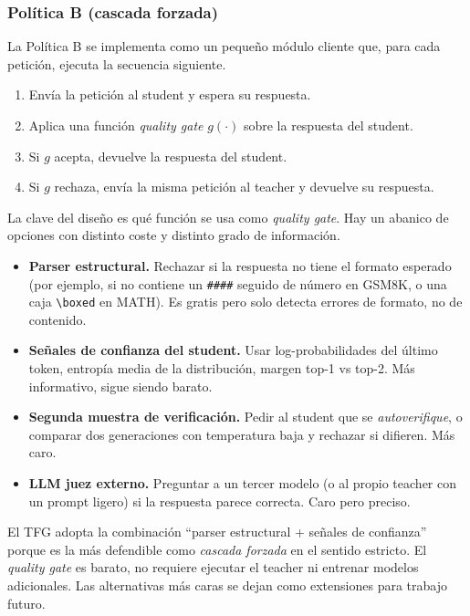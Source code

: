 \subsubsection{Política B (cascada forzada)}

La Política B se implementa como un pequeño módulo cliente que, para cada petición, ejecuta la secuencia siguiente.
\begin{enumerate}[nosep,leftmargin=*]
\item Envía la petición al student y espera su respuesta.
\item Aplica una función \textit{quality gate} $g(\cdot)$ sobre la respuesta del student.
\item Si $g$ acepta, devuelve la respuesta del student.
\item Si $g$ rechaza, envía la misma petición al teacher y devuelve su respuesta.
\end{enumerate}

La clave del diseño es qué función se usa como \textit{quality gate}. Hay un abanico de opciones con distinto coste y distinto grado de información.
\begin{itemize}[nosep,leftmargin=*]
\item \textbf{Parser estructural.} Rechazar si la respuesta no tiene el formato esperado (por ejemplo, si no contiene un \texttt{\#\#\#\#} seguido de número en GSM8K, o una caja \texttt{\textbackslash boxed} en MATH). Es gratis pero solo detecta errores de formato, no de contenido.
\item \textbf{Señales de confianza del student.} Usar log-probabilidades del último token, entropía media de la distribución, margen top-1 vs top-2. Más informativo, sigue siendo barato.
\item \textbf{Segunda muestra de verificación.} Pedir al student que se \textit{autoverifique}, o comparar dos generaciones con temperatura baja y rechazar si difieren. Más caro.
\item \textbf{LLM juez externo.} Preguntar a un tercer modelo (o al propio teacher con un prompt ligero) si la respuesta parece correcta. Caro pero preciso.
\end{itemize}

El TFG adopta la combinación ``parser estructural + señales de confianza'' porque es la más defendible como \textit{cascada forzada} en el sentido estricto. El \textit{quality gate} es barato, no requiere ejecutar el teacher ni entrenar modelos adicionales. Las alternativas más caras se dejan como extensiones para trabajo futuro.

